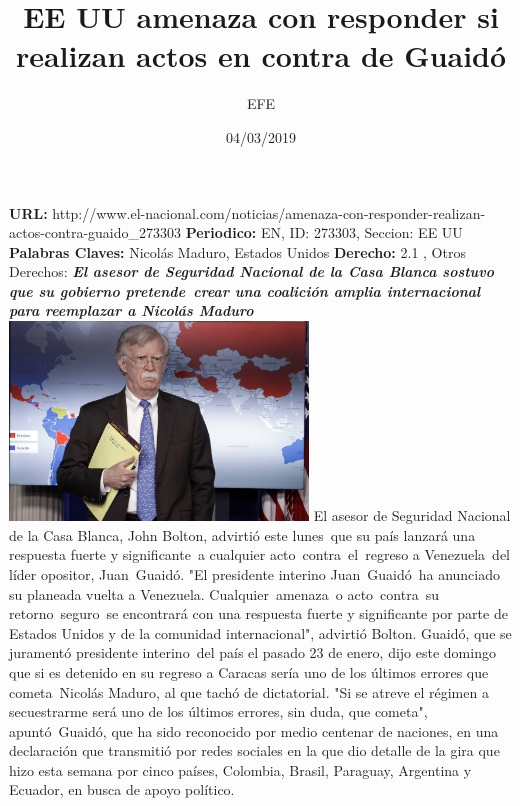 \documentclass{article}%
\title{\textbf{EE UU amenaza con responder si realizan actos en contra de Guaidó}}%
\author{EFE}%
\date{04/03/2019}%
\begin{document}
%
\normalsize%
\maketitle%
\textbf{URL: }%
http://www.el{-}nacional.com/noticias/amenaza{-}con{-}responder{-}realizan{-}actos{-}contra{-}guaido\_273303\newline%
%
\textbf{Periodico: }%
EN, %
ID: %
273303, %
Seccion: %
EE UU\newline%
%
\textbf{Palabras Claves: }%
Nicolás Maduro, Estados Unidos\newline%
%
\textbf{Derecho: }%
2.1%
, Otros Derechos: %
\newline%
%
\textbf{\textit{El asesor de Seguridad Nacional de la Casa Blanca sostuvo que su gobierno pretende~crear una coalición amplia internacional para reemplazar a Nicolás Maduro~}}%
\newline%
\newline%
%
\includegraphics[width=300px]{EN_273303.jpg}%
\newline%
%
El asesor de Seguridad Nacional de la Casa Blanca, John Bolton, advirtió este lunes~que su país lanzará una respuesta fuerte y significante~a cualquier acto~contra~el~regreso a Venezuela~del líder opositor, Juan~Guaidó.%
\newline%
%
"El presidente interino Juan~Guaidó~ha anunciado su planeada vuelta a Venezuela. Cualquier~amenaza~o acto~contra~su retorno~seguro~se encontrará con una respuesta fuerte y significante por parte de Estados Unidos y de la comunidad internacional", advirtió Bolton.%
\newline%
%
Guaidó, que se juramentó presidente interino~del país el pasado 23 de enero, dijo este domingo que si es detenido en su regreso a Caracas sería uno de los últimos errores que cometa~Nicolás Maduro, al que tachó de dictatorial.%
\newline%
%
"Si se atreve el régimen a secuestrarme será uno de los últimos errores, sin duda, que cometa", apuntó~Guaidó, que ha sido reconocido por medio centenar de naciones, en una declaración que transmitió por redes sociales en la que dio detalle de la gira que hizo esta semana por cinco países, Colombia, Brasil, Paraguay, Argentina y Ecuador, en busca de apoyo político.%
\end{document}
